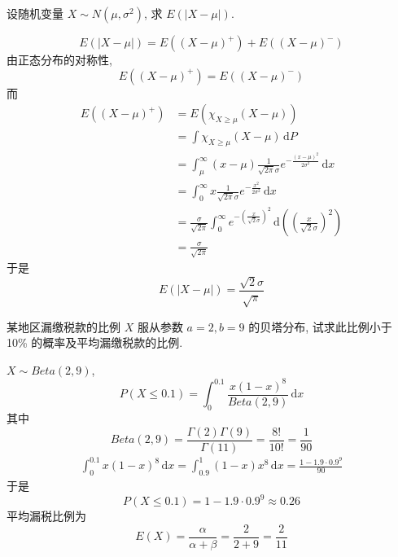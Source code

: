 \documentclass[../main.tex]{subfiles}
\begin{document}
\begin{exercise}{}{}
设随机变量 $X \sim N(\mu, \sigma^2)$, 求 $E(|X-\mu|)$.
\end{exercise}
\begin{solution}
   \[
   E\left(\left| X-\mu  \right|  \right)= E\left( \left( X-\mu  \right)^{+ }  \right)+ E\left( \left( X-\mu  \right)^{-}  \right)
   \]由正态分布的对称性,  \[
   E\left( \left( X-\mu  \right)^{+ }  \right)= E \left( \left( X-\mu  \right)^{-}  \right) 
   \]而 \[
   \begin{aligned}
   E\left( \left( X-\mu  \right)^{+ }  \right)&= E\left( \chi _{X\ge \mu }\left( X-\mu  \right)  \right)   \\ 
    &=  \int \chi _{X\ge \mu }\left( X-\mu  \right)\,\mathrm{d} P\\ 
     &= \int_{\mu }^{\infty} \left( x-\mu  \right) \frac{1 }{\sqrt{2 \pi  } \sigma }e^{-\frac{\left( x-\mu  \right)^{2}  }{2  \sigma ^{2} } }\,\mathrm{d} x\\ 
      &= \int_{0}^{\infty} x\frac{1 }{\sqrt{2 \pi } \sigma  }  e^{-\frac{x^{2} }{2 \sigma ^{2} } }\,\mathrm{d} x\\ 
       &= \frac{ \sigma  }{\sqrt{2 \pi } } \int_{0}^{\infty} e^{-\left( \frac{x }{\sqrt{2} \sigma  }  \right)^{2} } \,\mathrm{d} \left( \left( \frac{x }{\sqrt{2} \sigma  }  \right)^{2}  \right)   \\ 
        &= \frac{ \sigma  }{\sqrt{2 \pi } } 
   \end{aligned}
   \]于是 \[
   E\left( \left| X-\mu  \right|  \right)=  \frac{\sqrt{2} \sigma  }{\sqrt{ \pi }  }  
   \]
\end{solution}

\begin{exercise}{}{}
某地区漏缴税款的比例 $X$ 服从参数 $a=2, b=9$ 的贝塔分布, 试求此比例小于 10\% 的概率及平均漏缴税款的比例.
\end{exercise}
\begin{solution}
  \(  X\sim Beta \left( 2,9 \right)   \), \[
  P\left( X\le 0.1 \right)=  \int_{0}^{0.1}\frac{x \left( 1-x \right)^{8} }{Beta \left( 2,9 \right)  }\,\mathrm{d} x 
  \] 其中 \[
  Beta\left( 2,9 \right)= \frac{ \Gamma \left( 2 \right) \Gamma \left( 9 \right)   }{ \Gamma \left( 11 \right)  }= \frac{8! }{10! }= \frac{1 }{90 }    
  \] \[
  \begin{aligned}
  \int_{0}^{0.1}x\left( 1-x \right)^{8}\,\mathrm{d} x = \int_{0.9}^{1}\left( 1-x \right)x^{8}\,\mathrm{d} x=  \frac{1 - 1.9 \cdot 0.9^9}{90}
  \end{aligned}        
  \]于是 \[
  P\left( X\le 0.1 \right)= 1-1.9\cdot 0.9^{9}\approx 0.26
  \]平均漏税比例为 \[
  E\left( X \right)=  \frac{\alpha  }{\alpha + \beta  }= \frac{2 }{2+ 9 }= \frac{2 }{11 }   
  \]
\end{solution}
\end{document}
